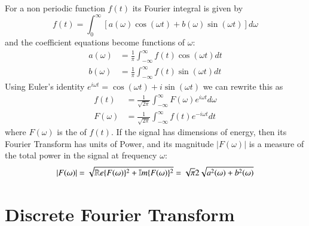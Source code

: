 \documentclass[12pt, a4paper, oneside, openright, titlepage]{book}
\begin{document}
\begin{proc}
        For a non periodic function $f(t)$ its Fourier integral is given by \begin{equation}
                f(t) = \int_0^{\infty}\left[a(\omega)\cos(\omega t) + b(\omega)\sin(\omega t)\right]d\omega
        \end{equation}
        and the coefficient equations become functions of $\omega$:\begin{align}
                a(\omega) &= \frac{1}{\pi}\int_{-\infty}^{\infty}f(t)\cos(\omega t)dt \\
                b(\omega) &= \frac{1}{\pi}\int_{-\infty}^{\infty}f(t)\sin(\omega t)dt
        \end{align}
        Using Euler's identity $e^{i\omega t} = \cos(\omega t) + i\sin(\omega t)$ we can rewrite this as \begin{align}
                f(t) &= \frac{1}{\sqrt{2\pi}}\int_{-\infty}^{\infty}F(\omega)e^{i\omega t}d\omega \\
                F(\omega) &= \frac{1}{\sqrt{2\pi}}\int_{-\infty}^{\infty}f(t)e^{-i\omega t}dt
        \end{align}
        where $F(\omega)$ is the  of $f(t)$. If the signal has dimensions of energy, then its Fourier Transform has units of Power, and its magnitude $|F(\omega)|$ is a measure of the total power in the signal at frequency $\omega$: \begin{equation}
                |F(\omega)| = \sqrt{\mathbb R e\{F(\omega)\}^2+\mathbb{I}m\{F(\omega)\}^2} = \sqrt{\pi}{2}\sqrt{a^2(\omega) + b^2(\omega)}
        \end{equation}
\end{proc}


\section{Discrete Fourier Transform}
\end{document}
